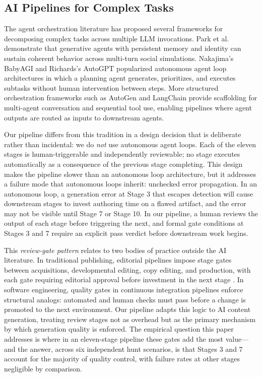 \subsection{AI Pipelines for Complex Tasks}

The agent orchestration literature has proposed several frameworks for decomposing complex
tasks across multiple LLM invocations. Park et al.\ \cite{park2023generative} demonstrate
that generative agents with persistent memory and identity can sustain coherent behavior
across multi-turn social simulations. Nakajima's BabyAGI \cite{nakajima2023babyagi} and
Richards's AutoGPT \cite{richards2023autogpt} popularized autonomous agent loop
architectures in which a planning agent generates, prioritizes, and executes subtasks
without human intervention between steps. More structured orchestration frameworks such as
AutoGen \cite{autogen} and LangChain \cite{langchain} provide scaffolding for multi-agent
conversation and sequential tool use, enabling pipelines where agent outputs are routed as
inputs to downstream agents.

Our pipeline differs from this tradition in a design decision that is deliberate rather than
incidental: we do \emph{not} use autonomous agent loops. Each of the eleven stages is
human-triggerable and independently reviewable; no stage executes automatically as a
consequence of the previous stage completing. This design makes the pipeline slower than an
autonomous loop architecture, but it addresses a failure mode that autonomous loops inherit:
unchecked error propagation. In an autonomous loop, a generation error at Stage 3 that
escapes detection will cause downstream stages to invest authoring time on a flawed
artifact, and the error may not be visible until Stage 7 or Stage 10. In our pipeline, a
human reviews the output of each stage before triggering the next, and formal gate
conditions at Stages 3 and 7 require an explicit pass verdict before downstream work begins.

This \emph{review-gate pattern} relates to two bodies of practice outside the AI literature.
In traditional publishing, editorial pipelines impose stage gates between acquisitions,
developmental editing, copy editing, and production, with each gate requiring editorial
approval before investment in the next stage \cite{schiffrin2010}. In software engineering,
quality gates in continuous integration pipelines enforce structural analogs: automated and
human checks must pass before a change is promoted to the next environment. Our pipeline
adapts this logic to AI content generation, treating review stages not as overhead but as
the primary mechanism by which generation quality is enforced. The empirical question this
paper addresses is where in an eleven-stage pipeline these gates add the most value---and
the answer, across six independent hunt scenarios, is that Stages 3 and 7 account for the
majority of quality control, with failure rates at other stages negligible by comparison.
